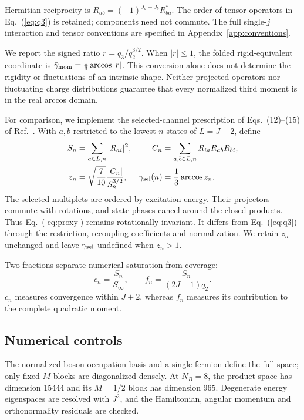 \documentclass[pdflatex,iicol,sn-mathphys-num]{sn-jnl}
\newcommand{\qmom}{\bar{\gamma}_{\rm mom}}
\newcommand{\gproxy}{\gamma_{\rm sel}}
\begin{document}
Hermitian reciprocity is
$R_{ab}=(-1)^{J_a-J_b}R_{ba}^{*}$. The order of tensor operators in
Eq.~(\ref{eq:q3}) is retained; components need not commute.
The full single-$j$ interaction and tensor conventions are specified in
Appendix~\ref{app:conventions}.

We report the signed ratio $r=q_3/q_2^{3/2}$. When $|r|\leq1$, the folded rigid-equivalent coordinate is $\qmom=\frac13\arccos|r|$. This conversion alone does not determine the rigidity or fluctuations of an intrinsic shape. Neither projected operators nor fluctuating charge distributions guarantee that every normalized third moment is in the real arccos domain.

For comparison, we implement the selected-channel prescription of Eqs.~(12)--(15) of Ref.~\cite{Nomura2017}. With $a,b$ restricted to the lowest $n$ states of $L=J+2$, define
\begin{align}
S_n&=\sum_{a\in L,n}|R_{ai}|^2,&
C_n&=\sum_{a,b\in L,n}R_{ia}R_{ab}R_{bi},\\
z_n&=\sqrt{\frac7{10}}\frac{|C_n|}{S_n^{3/2}},&
\gproxy(n)&=\frac13\arccos z_n.\label{eq:proxy}
\end{align}
The selected multiplets are ordered by excitation energy. Their projectors commute with rotations, and state phases cancel around the closed products. Thus Eq.~(\ref{eq:proxy}) remains rotationally invariant. It differs from Eq.~(\ref{eq:q3}) through the restriction, recoupling coefficients and normalization. We retain $z_n$ unchanged and leave $\gproxy$ undefined when $z_n>1$.

Two fractions separate numerical saturation from coverage:
\begin{equation}
c_n=\frac{S_n}{S_\infty},\qquad
f_n=\frac{S_n}{(2J+1)q_2}.
\label{eq:fractions}
\end{equation}
$c_n$ measures convergence within $J+2$, whereas $f_n$ measures its contribution to the complete quadratic moment.

\subsection{Numerical controls}

The normalized boson occupation basis and a single fermion define the full space; only fixed-$M$ blocks are diagonalized densely. At $N_B=8$, the product space has dimension 15444 and its $M=1/2$ block has dimension 965. Degenerate energy eigenspaces are resolved with $J^2$, and the Hamiltonian, angular momentum and orthonormality residuals are checked.
\end{document}
